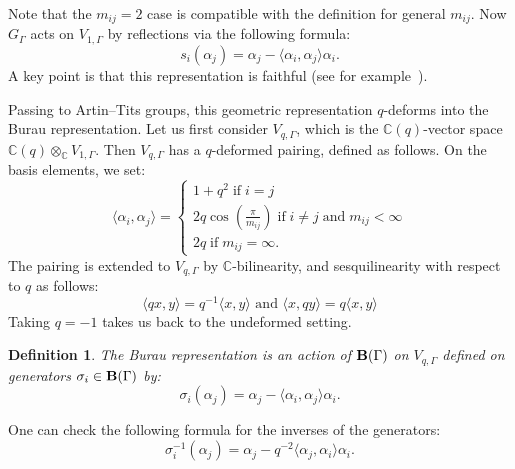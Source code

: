 \documentclass[a4paper]{amsart}
\newcommand{\C}{\mathbb{C}}
\newcommand{\0}{\mathbf{0}}
\newcommand{\B}{{\bf B}}
\theoremstyle{theorem}
\newtheorem{remark}[theorem]{Remark}
\newtheorem{definition}[theorem]{Definition}
\begin{document}
Note that the $m_{ij}=2$ case is compatible with the definition for general $m_{ij}$.
Now $G_\Gamma$ acts on $V_{1, \Gamma}$ by reflections via the following formula:
\[
s_i(\alpha_j)=\alpha_j-\langle \alpha_i,\alpha_j\rangle \alpha_i.
\]
A key point is that this representation is faithful (see for example~\cite[Thm 4.2.7]{BjornerBrenti}).

Passing to Artin--Tits groups, this geometric representation $q$-deforms into the Burau representation.
Let us first consider \(V_{q, \Gamma}\), which is the \(\mathbb{C}(q)\)-vector space \(\mathbb{C}(q) \otimes_{\mathbb{C}}V_{1, \Gamma}\).
Then \(V_{q, \Gamma}\) has a \(q\)-deformed pairing, defined as follows.
On the basis elements, we set:
\[
\langle \alpha_i,\alpha_j\rangle =\begin{cases}
1+q^2 \;\text{if}\;i=j \\
2q\cos(\frac{\pi}{m_{ij}})\; \text{if}\;i\neq j\;\text{and}\; m_{ij}<\infty \\
2q\;\text{if}\;m_{ij}=\infty.
\end{cases}
\]
The pairing is extended to \(V_{q,\Gamma}\) by \(\mathbb{C}\)-bilinearity, and sesquilinearity with respect to \(q\) as follows:
\[\langle qx,y \rangle = q^{-1}\langle x,y \rangle \text{ and } \langle x,qy \rangle = q\langle x,y \rangle\]
Taking $q=-1$ takes us back to the undeformed setting.


\begin{definition}\label{def:burau-rep}
  The \emph{Burau representation} is an action of $\B(\Gamma)$ on $V_{q, \Gamma}$ defined on generators $\sigma_i\in \B(\Gamma)$ by:
  \[
    \sigma_i(\alpha_j)=\alpha_j-\langle \alpha_i,\alpha_j\rangle \alpha_i.
  \]
\end{definition}
One can check the following formula for the inverses of the generators:
\[
\sigma_i^{-1}(\alpha_j)=\alpha_j-q^{-2}\langle \alpha_j,\alpha_i\rangle \alpha_i.
\]

\end{document}
